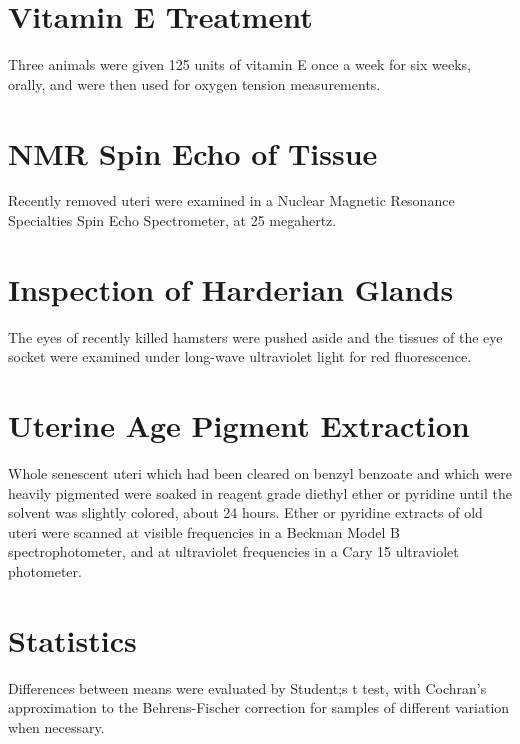 \section{Vitamin E Treatment}

Three animals were given 125 units of vitamin E once a week for six weeks, orally, and were then used for oxygen tension measurements.

\section{NMR Spin Echo of Tissue}

Recently removed uteri were examined in a Nuclear Magnetic Resonance Specialties Spin Echo Spectrometer, at 25 megahertz.

\section{Inspection of Harderian Glands}

The eyes of recently killed hamsters were pushed aside and the tissues of the eye socket were examined under long-wave ultraviolet light for red fluorescence.

\section{Uterine Age Pigment Extraction}

Whole senescent uteri which had been cleared on benzyl benzoate and which were heavily pigmented were soaked in reagent grade diethyl ether or pyridine
until the solvent was slightly colored, about 24 hours. Ether or pyridine extracts of old uteri were scanned at visible frequencies in a Beckman Model B spectrophotometer, and
at ultraviolet frequencies in a Cary 15 ultraviolet photometer.

\section{Statistics}

Differences between means were evaluated by Student;s t test, with Cochran's approximation to the Behrens-Fischer correction for samples of different variation when necessary.